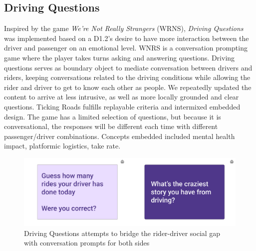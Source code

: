 \subsection{Driving Questions} \label{questions}
Inspired by the game \textit{We’re Not Really Strangers} (WRNS), \textit{Driving Questions} was implemented based on a D1.2's desire to have more interaction between the driver and passenger on an emotional level. WNRS is a conversation prompting game where the player takes turns asking and answering questions. Driving questions serves as boundary object to mediate conversation between drivers and riders, keeping conversations related to the driving conditions while allowing the rider and driver to get to know each other as people. We repeatedly updated the content to arrive at less intrusive, as well as more locally grounded and clear questions.
Ticking Roads fulfills replayable criteria and intermixed embedded design. The game has a limited selection of questions, but because it is conversational, the responses will be different each time with different passenger/driver combinations. 
Concepts embedded included mental health impact, platformic logistics, take rate.

\FloatBarrier
\begin{figure}[h!]
    \centering
\includegraphics[width=.7\linewidth]{Chapters/figures/questions.png}
    \caption{Driving Questions attempts to bridge the rider-driver social gap with conversation prompts for both sides}
    \label{crossroad}
\end{figure}
\FloatBarrier

